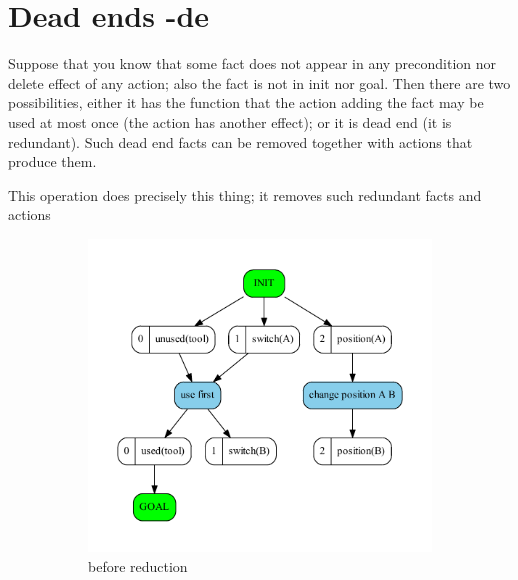 \chapter{Dead ends -de}

	Suppose that you know that some fact does not appear in any precondition nor delete effect of any action; also the fact is not in init nor goal. Then there are two possibilities, either it has the function that the action adding the fact may be used at most once (the action has another effect); or it is dead end (it is redundant). Such dead end facts can be removed together with actions that produce them.
	
	This operation does precisely this thing; it removes such redundant facts and actions
	
	\begin{figure}
		\begin{subfigure}[b]{0.4\textwidth}
			\includegraphics[scale=0.35]{deadEnds/figures/oneDeadEnd_input}
			\caption{before reduction}
		\end{subfigure}	
		\begin{subfigure}[b]{0.4\textwidth}

\end{subfigure}
\end{figure}
